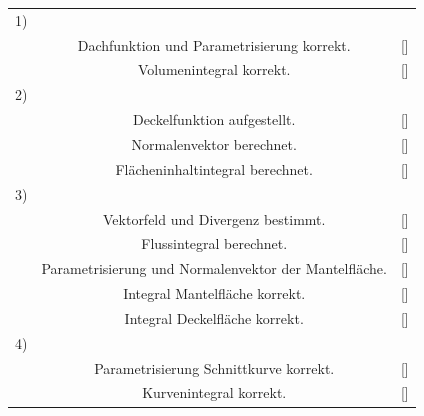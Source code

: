 \documentclass[11pt,final]{scrreprt}
\begin{document}
\begin{tabular}{rcl}
1) &  &  \\
 & Dachfunktion und Parametrisierung korrekt. & [\hspace*{0.3cm}] \\ 
 & Volumenintegral korrekt. & [\hspace*{0.3cm}] \\ 
2) &  &  \\
 & Deckelfunktion aufgestellt. & [\hspace*{0.3cm}] \\ 
 & Normalenvektor berechnet. & [\hspace*{0.3cm}] \\ 
 & Flächeninhaltintegral berechnet. & [\hspace*{0.3cm}] \\ 
3) &  &  \\
 & Vektorfeld und Divergenz bestimmt. & [\hspace*{0.3cm}] \\ 
 & Flussintegral berechnet. & [\hspace*{0.3cm}] \\ 
 & Parametrisierung und Normalenvektor der Mantelfläche. & [\hspace*{0.3cm}] \\
 & Integral Mantelfläche korrekt. & [\hspace*{0.3cm}] \\ 
 & Integral Deckelfläche korrekt. & [\hspace*{0.3cm}] \\  
4) &  &  \\
 & Parametrisierung Schnittkurve korrekt. & [\hspace*{0.3cm}] \\ 
 & Kurvenintegral korrekt. & [\hspace*{0.3cm}] \\ 
 \end{tabular}
 
\end{document}
